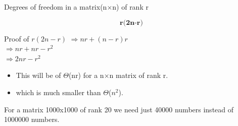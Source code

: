 \documentclass{beamer}
\begin{document}




\begin{frame}{Degrees of freedom in a matrix(n$\times$n) of rank r}

	$$ \textbf{r(2n-r)} $$
	\vspace {-5mm}
	\begin{block}{Proof of ${r(2n-r)}$}
		$\Rightarrow nr +  (n-r)r$ \\
		$\Rightarrow nr + nr - r^2$  \\
		$\Rightarrow 2nr - r^2$  \\
	\end{block}
	
	\begin{itemize}
	  \item This will be of $\Theta$(nr) for a n$\times$n matrix of rank r.
	  \item which is much smaller than $\Theta$($n^2$).
	\end{itemize}
	\vspace{3mm}
	\begin{example}
	  For a matrix 1000x1000 of rank 20 we need just 40000 numbers instead of 1000000 numbers.
	\end{example}	
\end{frame}
\end{document}
